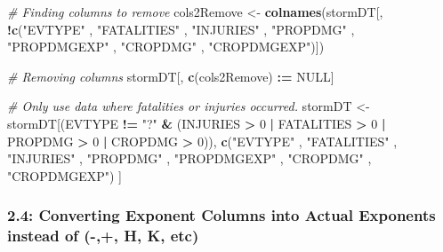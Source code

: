 \documentclass[
]{article}
\newenvironment{Shaded}{\begin{snugshade}}{\end{snugshade}}
\newcommand{\CommentTok}[1]{\textcolor[rgb]{0.56,0.35,0.01}{\textit{#1}}}
\newcommand{\DecValTok}[1]{\textcolor[rgb]{0.00,0.00,0.81}{#1}}
\newcommand{\ErrorTok}[1]{\textcolor[rgb]{0.64,0.00,0.00}{\textbf{#1}}}
\newcommand{\KeywordTok}[1]{\textcolor[rgb]{0.13,0.29,0.53}{\textbf{#1}}}
\newcommand{\NormalTok}[1]{#1}
\newcommand{\OperatorTok}[1]{\textcolor[rgb]{0.81,0.36,0.00}{\textbf{#1}}}
\newcommand{\OtherTok}[1]{\textcolor[rgb]{0.56,0.35,0.01}{#1}}
\newcommand{\StringTok}[1]{\textcolor[rgb]{0.31,0.60,0.02}{#1}}
\begin{document}
\begin{Shaded}
\begin{Highlighting}[]
\CommentTok{# Finding columns to remove}
\NormalTok{cols2Remove <-}\StringTok{ }\KeywordTok{colnames}\NormalTok{(stormDT[, }\OperatorTok{!}\KeywordTok{c}\NormalTok{(}\StringTok{"EVTYPE"}
\NormalTok{  , }\StringTok{"FATALITIES"}
\NormalTok{  , }\StringTok{"INJURIES"}
\NormalTok{  , }\StringTok{"PROPDMG"}
\NormalTok{  , }\StringTok{"PROPDMGEXP"}
\NormalTok{  , }\StringTok{"CROPDMG"}
\NormalTok{  , }\StringTok{"CROPDMGEXP"}\NormalTok{)])}

\CommentTok{# Removing columns}
\NormalTok{stormDT[, }\KeywordTok{c}\NormalTok{(cols2Remove) }\OperatorTok{:}\ErrorTok{=}\StringTok{ }\OtherTok{NULL}\NormalTok{]}

\CommentTok{# Only use data where fatalities or injuries occurred.  }
\NormalTok{stormDT <-}\StringTok{ }\NormalTok{stormDT[(EVTYPE }\OperatorTok{!=}\StringTok{ "?"} \OperatorTok{&}\StringTok{ }
\StringTok{             }\NormalTok{(INJURIES }\OperatorTok{>}\StringTok{ }\DecValTok{0} \OperatorTok{|}\StringTok{ }\NormalTok{FATALITIES }\OperatorTok{>}\StringTok{ }\DecValTok{0} \OperatorTok{|}\StringTok{ }\NormalTok{PROPDMG }\OperatorTok{>}\StringTok{ }\DecValTok{0} \OperatorTok{|}\StringTok{ }\NormalTok{CROPDMG }\OperatorTok{>}\StringTok{ }\DecValTok{0}\NormalTok{)), }\KeywordTok{c}\NormalTok{(}\StringTok{"EVTYPE"}
\NormalTok{                                                                            , }\StringTok{"FATALITIES"}
\NormalTok{                                                                            , }\StringTok{"INJURIES"}
\NormalTok{                                                                            , }\StringTok{"PROPDMG"}
\NormalTok{                                                                            , }\StringTok{"PROPDMGEXP"}
\NormalTok{                                                                            , }\StringTok{"CROPDMG"}
\NormalTok{                                                                            , }\StringTok{"CROPDMGEXP"}\NormalTok{) ]}
\end{Highlighting}
\end{Shaded}

\hypertarget{converting-exponent-columns-into-actual-exponents-instead-of---h-k-etc}{%
\subsubsection{2.4: Converting Exponent Columns into Actual Exponents
instead of (-,+, H, K,
etc)}\label{converting-exponent-columns-into-actual-exponents-instead-of---h-k-etc}}
\end{document}
